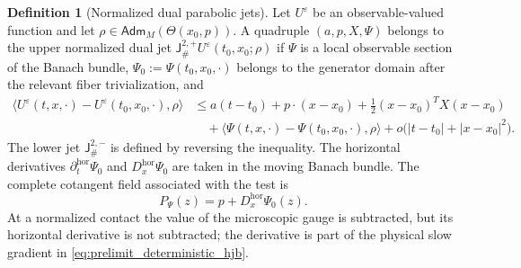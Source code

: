 \documentclass[12pt, letterpaper]{amsart}
\newcommand{\Hor}{\mathrm{hor}}
\newcommand{\Jet}{\mathsf{J}}
\newcommand{\Adm}{\mathsf{Adm}}
\theoremstyle{plain}
\theoremstyle{definition}
\newtheorem{definition}[theorem]{Definition}
\theoremstyle{remark}
\begin{document}
\begin{definition}[Normalized dual parabolic jets]
\label{def:dual_parabolic_jets}
Let $U^\varepsilon$ be an observable-valued function and let
$\rho\in\Adm_M(\Theta(x_0,p))$.  A quadruple
$(a,p,X,\Psi)$ belongs to the upper normalized dual jet
$\Jet^{2,+}_\#U^\varepsilon(t_0,x_0;\rho)$ if $\Psi$ is a local observable
section of the Banach bundle,
$\Psi_0:=\Psi(t_0,x_0,\cdot)$ belongs to the generator domain after the
relevant fiber trivialization, and
\begin{equation}
\label{eq:dual_jet_upper}
\begin{split}
    \big\langle U^\varepsilon(t,x,\cdot)-U^\varepsilon(t_0,x_0,\cdot),\rho\big\rangle
    &\le a(t-t_0)+p\cdot(x-x_0)
        +\frac12(x-x_0)^TX(x-x_0)\\
    &\quad +\big\langle\Psi(t,x,\cdot)-\Psi(t_0,x_0,\cdot),\rho\big\rangle
        +o\bigl(|t-t_0|+|x-x_0|^2\bigr).
\end{split}
\end{equation}
The lower jet $\Jet^{2,-}_\#$ is defined by reversing the inequality.  The
horizontal derivatives $\partial_t^{\Hor}\Psi_0$ and
$D_x^{\Hor}\Psi_0$ are taken in the moving Banach bundle.  The complete
cotangent field associated with the test is
\begin{equation}
\label{eq:complete_dual_cotangent_field}
    P_\Psi(z)=p+D_x^{\Hor}\Psi_0(z).
\end{equation}
At a normalized contact the value of the microscopic gauge is subtracted, but
its horizontal derivative is not subtracted; the derivative is part of the
physical slow gradient in \eqref{eq:prelimit_deterministic_hjb}.
\end{definition}
\end{document}
